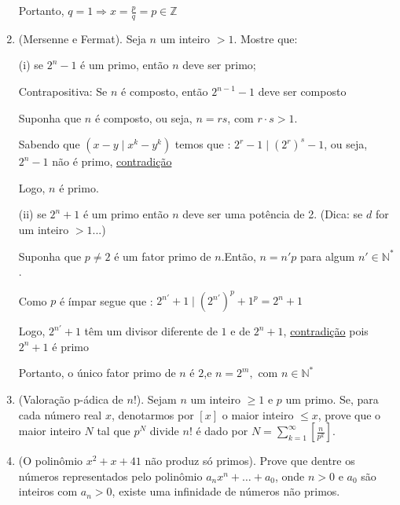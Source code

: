 \documentclass[a4paper,12pt]{article}
\begin{document}
\begin{enumerate}[label=4.\arabic*.]
    Portanto, $q = 1 \Rightarrow x = \frac{p}{q} = p \in \mathbb{Z}$

    \item (Mersenne e Fermat). Seja $n$ um inteiro $>1$. Mostre que: 
    
    (i) se $2^n - 1$ é um primo, então $n$ deve ser primo; 
    
    Contrapositiva: Se $n$ é composto, então $2^{n-1} - 1$ deve ser composto
    
    Suponha que $n$ é composto, ou seja, $n = rs$, com $r \cdot s > 1$.
    
    Sabendo que $(x-y \mid x^k - y^k)$ temos que : $2^r - 1 \mid (2^r)^s - 1$, ou seja, $2^n - 1$ não é primo,
    \underline{contradição}

    Logo, $n$ é primo.

    (ii) se $2^n + 1$ é um primo então $n$ deve ser uma potência de 2. (Dica: se $d$ for um inteiro $>1$...)
    
    Suponha que $p \neq 2$ é um fator primo de $n$.Então, $n = n'p$ para algum $n' \in \mathbb{N}^*$.
    
    Como $p$ é ímpar segue que : $2^{n'} + 1 \mid (2^{n'})^p + 1^p = 2^n + 1$
    
    Logo, $2^{n'} + 1$ têm um divisor diferente de $1$ e de $2^n + 1$, \underline{contradição} pois $2^n + 1$ é primo

    Portanto, o único fator primo de $n$ é $2$,e $n = 2^m,\text{ com } n \in \mathbb{N}^*$
        
    \item (Valoração p-ádica de $n!$). Sejam $n$ um inteiro $\geq 1$ e $p$ um primo. Se, para cada número real $x$, denotarmos por $[x]$ o maior inteiro $\leq x$, prove que o maior inteiro $N$ tal que $p^N$ divide $n!$ é dado por $N = \sum_{k=1}^{\infty} \left[ \frac{n}{p^k} \right]$.
    
    

    \item (O polinômio $x^2 + x + 41$ não produz só primos). Prove que dentre os números representados pelo polinômio $a_n x^n + \ldots + a_0$, onde $n > 0$ e $a_0$ são inteiros com $a_n > 0$, existe uma infinidade de números não primos.

    

\end{enumerate}
\end{document}
